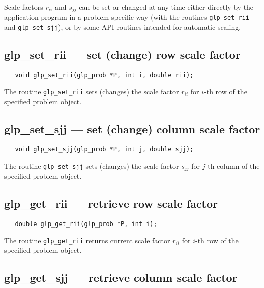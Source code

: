 Scale factors $r_{ii}$ and $s_{jj}$ can be set or changed at any time
either directly by the application program in a problem specific way
(with the routines \verb|glp_set_rii| and \verb|glp_set_sjj|), or by
some API routines intended for automatic scaling.

\subsection{glp\_set\_rii --- set (change) row scale factor}

\synopsis

\begin{verbatim}
   void glp_set_rii(glp_prob *P, int i, double rii);
\end{verbatim}

\description

The routine \verb|glp_set_rii| sets (changes) the scale factor $r_{ii}$
for $i$-th row of the specified problem object.

\subsection{glp\_set\_sjj --- set (change) column scale factor}

\synopsis

\begin{verbatim}
   void glp_set_sjj(glp_prob *P, int j, double sjj);
\end{verbatim}

\description

The routine \verb|glp_set_sjj| sets (changes) the scale factor $s_{jj}$
for $j$-th column of the specified problem object.

\subsection{glp\_get\_rii --- retrieve row scale factor}

\synopsis

\begin{verbatim}
   double glp_get_rii(glp_prob *P, int i);
\end{verbatim}

\returns

The routine \verb|glp_get_rii| returns current scale factor $r_{ii}$
for $i$-th row of the specified problem object.

\vspace*{-6pt}

\subsection{glp\_get\_sjj --- retrieve column scale factor}

